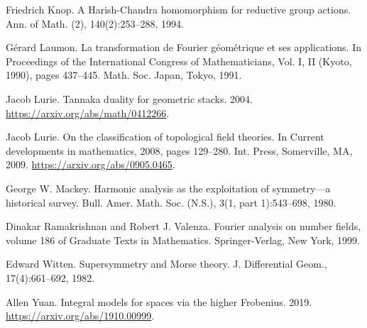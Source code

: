 \begin{list}{}{\setlength{\leftmargin}{5.6em}\setlength{\labelwidth}{5.2em}
\setlength{\itemindent}{0pt}\setlength{\labelsep}{0.4em}\setlength{\parsep}{0.25em}
\raggedright}
\item[{[Kno94]}]
Friedrich Knop. A Harish-Chandra homomorphism for reductive group actions. Ann. of Math. (2), 140(2):253--288, 1994.
\item[{[Lau91]}]
Gérard Laumon. La transformation de Fourier géométrique et ses applications. In Proceedings of the International Congress of Mathematicians, Vol. I, II (Kyoto, 1990), pages 437--445. Math. Soc. Japan, Tokyo, 1991.
\item[{[Lur04]}]
Jacob Lurie. Tannaka duality for geometric stacks. 2004. \url{https://arxiv.org/abs/math/0412266}.
\item[{[Lur09]}]
Jacob Lurie. On the classification of topological field theories. In Current developments in mathematics, 2008, pages 129--280. Int. Press, Somerville, MA, 2009. \url{https://arxiv.org/abs/0905.0465}.
\item[{[Mac80]}]
George W. Mackey. Harmonic analysis as the exploitation of symmetry---a historical survey. Bull. Amer. Math. Soc. (N.S.), 3(1, part 1):543--698, 1980.
\item[{[RV99]}]
Dinakar Ramakrishnan and Robert J. Valenza. Fourier analysis on number fields, volume 186 of Graduate Texts in Mathematics. Springer-Verlag, New York, 1999.
\item[{[Wit82]}]
Edward Witten. Supersymmetry and Morse theory. J. Differential Geom., 17(4):661--692, 1982.
\item[{[Yua19]}]
Allen Yuan. Integral models for spaces via the higher Frobenius. 2019. \url{https://arxiv.org/abs/1910.00999}.
\end{list}
